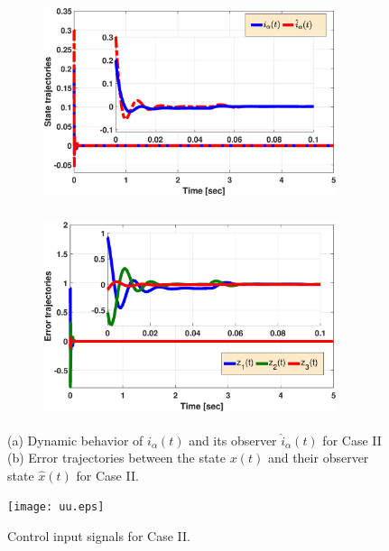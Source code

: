 \documentclass[preprint,11pt]{elsarticle}
\begin{document}
    \begin{figure}[h]
    \begin{subfigure}[b]{0.5\textwidth}
    \centerline{\includegraphics[width=8.6cm,height=5.8cm]{xx3.eps}}
    \caption{ }
    \end{subfigure}
    \begin{subfigure}[b]{0.5\textwidth}
    \centerline{\includegraphics[width=8.6cm,height=5.8cm]{zz1.eps}}
    \caption{ }
    \end{subfigure}
    \caption{(a) Dynamic behavior of $i_\alpha(t)$ and its observer $\hat{i}_\alpha(t)$ for Case II  (b) Error trajectories between the state $x(t)$ and their observer state $\hat{x}(t)$ for Case II.} \label{F4}
    \end{figure}
    \begin{figure}[h]
\centering
  \texttt{[image: uu.eps]}
\caption{Control input signals for Case II.}
\label{F10}\vspace{-0.5cm}
\end{figure}
\end{document}
